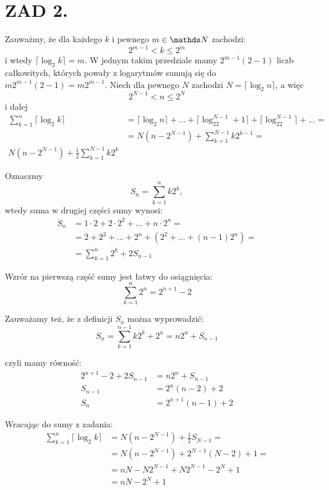 \documentclass{article}[13pt]
\begin{document}
    \section*{ZAD 2.}

    Zauważmy, że dla każdego $k$ i pewnego $m\in\N$ zachodzi:
    $$2^{m-1}< k \leq 2^m$$
    i wtedy $\lceil\log_2 k\rceil = m$. W jednym takim przedziale mamy $2^{m-1}(2-1)$ liczb całkowitych, których powały z logarytmów sumują się do $m2^{m-1}(2-1)=m2^{m-1}$. Niech dla pewnego $N$ zachodzi $N=\lceil\log_2n\rceil$, a więc
    $$2^{N-1}<n\leq 2^N$$
    i dalej
    \begin{align*}
        \sum\limits_{k=1}^n\lceil\log_2k\rceil&=\lceil\log_2n\rceil+...+\lceil\log_22^{N-1}+1\rceil+\lceil\log_22^{N-1}\rceil+...=\\
        &=N(n-2^{N-1})+\sum\limits_{k=1}^{N-1}k2^{k-1}=\\
        N(n-2^{N-1})+\frac12\sum\limits_{k=1}^{N-1}k2^k
    \end{align*}

    Oznaczmy
    $$S_n=\sum\limits_{k=1}^nk2^k,$$
    wtedy suma w drugiej części sumy wynosi:
    \begin{align*}
        S_n&=1\cdot2+2\cdot 2^2+...+ n\cdot2^n=\\
            &=2+2^2+...+2^n+(2^2+...+(n-1)2^n)=\\
            &=\sum\limits_{k=1}^n2^k+2S_{n-1}
    \end{align*}

    Wzrór na pierwszą część sumy jest łatwy do osiągnięcia:
    $$\sum\limits_{k=1}^n2^n=2^{n+1}-2$$

    Zauważamy też, że z definicji $S_n$ można wyprowadzić:
    $$S_n=\sum\limits_{k=1}^{n-1}k2^k+2^n=n2^n+S_{n-1}$$

    czyli mamy równość:
    \begin{align*}
        2^{n+1}-2+2S_{n-1}&=n2^n+S_{n-1}\\
        S_{n-1}&=2^n(n-2)+2\\
        S_n&=2^{n+1}(n-1)+2
    \end{align*}

    Wracając do sumy z zadania:
    \begin{align*}
        \sum\limits_{k=1}^n\lceil\log_2k\rceil&=N(n-2^{N-1})+\frac12S_{N-1}=\\
        &=N(n-2^{N-1})+2^{N-1}(N-2)+1=\\
        &=nN-N2^{N-1}+N2^{N-1}-2^N+1\\
        &=nN-2^N+1
    \end{align*}
\end{document}
